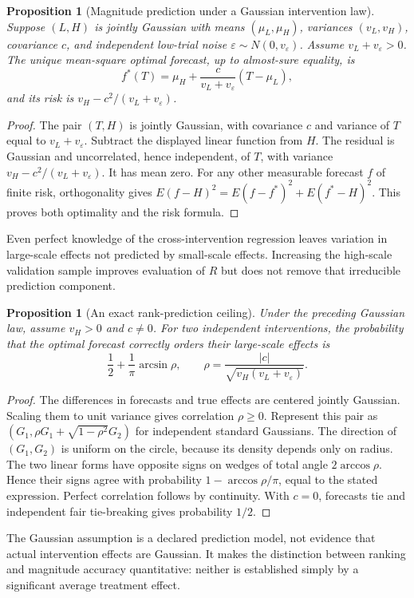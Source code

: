 \documentclass[11pt]{article}
\newtheorem{proposition}[theorem]{Proposition}
\theoremstyle{remark}
\begin{document}
\begin{proposition}[Magnitude prediction under a Gaussian intervention law]
Suppose $(L,H)$ is jointly Gaussian with means $(\mu_L,\mu_H)$, variances $(v_L,v_H)$, covariance $c$, and independent low-trial noise $\varepsilon\sim N(0,v_\varepsilon)$. Assume $v_L+v_\varepsilon>0$. The unique mean-square optimal forecast, up to almost-sure equality, is
\[
 f^*(T)=\mu_H+\frac{c}{v_L+v_\varepsilon}(T-\mu_L),
\]
and its risk is $v_H-c^2/(v_L+v_\varepsilon)$.
\end{proposition}
\begin{proof}
The pair $(T,H)$ is jointly Gaussian, with covariance $c$ and variance of $T$ equal to $v_L+v_\varepsilon$. Subtract the displayed linear function from $H$. The residual is Gaussian and uncorrelated, hence independent, of $T$, with variance $v_H-c^2/(v_L+v_\varepsilon)$. It has mean zero. For any other measurable forecast $f$ of finite risk, orthogonality gives
$E(f-H)^2=E(f-f^*)^2+E(f^*-H)^2$.
This proves both optimality and the risk formula.
\end{proof}
Even perfect knowledge of the cross-intervention regression leaves variation in large-scale effects not predicted by small-scale effects. Increasing the high-scale validation sample improves evaluation of $R$ but does not remove that irreducible prediction component.

\begin{proposition}[An exact rank-prediction ceiling]
Under the preceding Gaussian law, assume $v_H>0$ and $c\ne0$. For two independent interventions, the probability that the optimal forecast correctly orders their large-scale effects is
\[
 \frac12+\frac1\pi\arcsin\rho,\qquad
 \rho=\frac{|c|}{\sqrt{v_H(v_L+v_\varepsilon)}}.
\]
\end{proposition}
\begin{proof}
The differences in forecasts and true effects are centered jointly Gaussian. Scaling them to unit variance gives correlation $\rho\ge0$. Represent this pair as $(G_1,\rho G_1+\sqrt{1-\rho^2}G_2)$ for independent standard Gaussians. The direction of $(G_1,G_2)$ is uniform on the circle, because its density depends only on radius. The two linear forms have opposite signs on wedges of total angle $2\arccos\rho$. Hence their signs agree with probability $1-\arccos\rho/\pi$, equal to the stated expression. Perfect correlation follows by continuity. With $c=0$, forecasts tie and independent fair tie-breaking gives probability $1/2$.
\end{proof}
The Gaussian assumption is a declared prediction model, not evidence that actual intervention effects are Gaussian. It makes the distinction between ranking and magnitude accuracy quantitative: neither is established simply by a significant average treatment effect.
\end{document}

